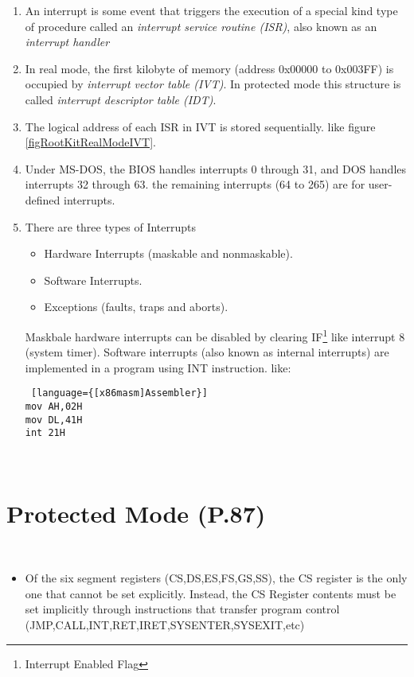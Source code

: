 \begin{note}
\begin{enumerate}
\item An interrupt is some event that triggers the execution of a special kind type of procedure called an \textit{interrupt service routine (ISR)}, also known as an \textit{interrupt handler}
\item In real mode, the first kilobyte of memory (address 0x00000 to 0x003FF) is occupied by \textit{interrupt vector table (IVT)}. In protected mode this structure is called \textit{interrupt descriptor table (IDT)}.
\item The logical address of each ISR in IVT is stored sequentially. like figure \ref{figRootKitRealModeIVT}.

\item Under MS-DOS, the BIOS handles interrupts 0 through 31, and DOS handles interrupts 32 through 63. the remaining interrupts (64 to 265) are for user-defined interrupts.
\item There are three types of Interrupts
\begin{itemize}
\item Hardware Interrupts (maskable and nonmaskable).
\item Software Interrupts.
\item Exceptions (faults, traps and aborts).
\end{itemize}
Maskbale hardware interrupts can be disabled by clearing IF\footnote{Interrupt Enabled Flag} like interrupt 8 (system timer). Software interrupts (also known as internal interrupts) are implemented in a program using INT instruction. like:
\begin{lstlisting} [language={[x86masm]Assembler}]
mov AH,02H
mov DL,41H
int 21H
\end{lstlisting}
\end{enumerate}
\end{note}

\begin{note}\\


\end{note}

\section{Protected Mode (P.87)}
\begin{note}\\

\begin{itemize}
\item Of the six segment registers (CS,DS,ES,FS,GS,SS), the CS register is the only one that cannot be set explicitly. Instead, the CS Register contents must be set implicitly through instructions that transfer program control (JMP,CALL,INT,RET,IRET,SYSENTER,SYSEXIT,etc)
\end{itemize}
\end{note}

